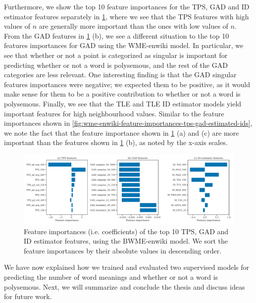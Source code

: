 Furthermore, we show the top 10 feature importances for the TPS, GAD and ID estimator features separately in \cref{fig:bwme-enwiki-feature-importances-tps-gad-estimated-ids}, where we see that the TPS features with high values of $n$ are generally more important than the ones with low values of $n$. From the GAD features in \cref{fig:bwme-enwiki-feature-importances-tps-gad-estimated-ids} (b), we see a different situation to the top 10 features importances for GAD using the WME-enwiki model. In particular, we see that whether or not a point is categorized as singular is important for predicting whether or not a word is polysemous, and the rest of the GAD categories are less relevant. One interesting finding is that the GAD singular features importances were negative; we expected them to be positive, as it would make sense for them to be a positive contribution to whether or not a word is polysemous. Finally, we see that the TLE and TLE ID estimator models yield important features for high neighbourhood values. Similar to the feature importances shown in \cref{fig:wme-enwiki-feature-importances-tps-gad-estimated-ids}, we note the fact that the feature importance shown in \cref{fig:bwme-enwiki-feature-importances-tps-gad-estimated-ids} (a) and (c) are more important than the features shown in \cref{fig:bwme-enwiki-feature-importances-tps-gad-estimated-ids} (b), as noted by the x-axis scales.
\begin{figure}[H]
    \centering
    \includegraphics[width=\textwidth]{thesis/figures/bwme-enwiki-top-10-feature-importances-tps-gad-estimated-ids.pdf}
    \caption{Feature importances (i.e. coefficients) of the top 10 TPS, GAD and ID estimator features, using the BWME-enwiki model. We sort the feature importances by their absolute values in descending order.}
    \label{fig:bwme-enwiki-feature-importances-tps-gad-estimated-ids}
\end{figure}

We have now explained how we trained and evaluated two supervised models for predicting the number of word meanings and whether or not a word is polysemous. Next, we will summarize and conclude the thesis and discuss ideas for future work.